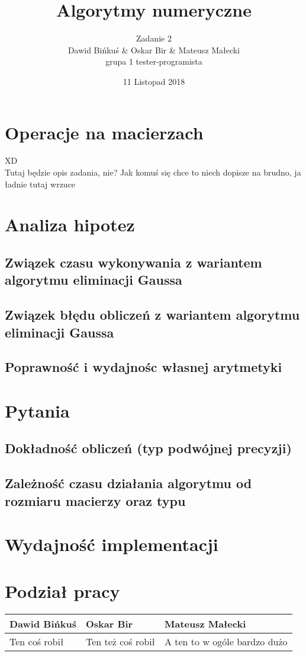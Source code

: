 \documentclass[10pt]{article}
\title{Algorytmy numeryczne}
\author{Zadanie 2 \\ Dawid Bińkuś \& Oskar Bir \& Mateusz Małecki\\grupa 1 tester-programista}
\date{11 Listopad 2018}
\begin{document}
\maketitle 

\section{Operacje na macierzach}


XD\\
Tutaj będzie opis zadania, nie? Jak komuś się chce to niech dopisze na brudno, ja ładnie tutaj wrzuce

\section{Analiza hipotez}
\subsection{Związek czasu wykonywania z wariantem algorytmu eliminacji Gaussa}
\subsection{Związek błędu obliczeń z wariantem algorytmu eliminacji Gaussa}
\subsection{Poprawność i wydajnośc własnej arytmetyki}
\section{Pytania}
\subsection{Dokładność obliczeń (typ podwójnej precyzji)}
\subsection{Zależność czasu działania algorytmu od rozmiaru macierzy oraz typu}
\section{Wydajność implementacji}
\section{Podział pracy}
\begin{center}
	\begin{tabular}{| l | l | l |}
		\hline
		\textbf{Dawid Bińkuś} & \textbf{Oskar Bir} & \textbf{Mateusz Małecki} \\ \hline
		Ten coś robił & Ten też coś robił & A ten to w ogóle bardzo dużo \\ \hline
		
		
	\end{tabular}
\end{center}
\end{document}
